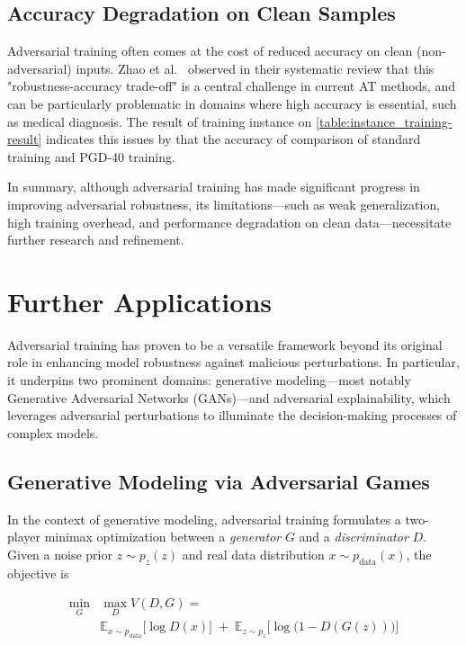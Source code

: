 \documentclass[10pt,twocolumn,letterpaper]{article}
\begin{document}
\subsection{Accuracy Degradation on Clean Samples}
Adversarial training often comes at the cost of reduced accuracy on clean (non-adversarial) inputs. Zhao et al.~\cite{a15080283} observed in their systematic review that this "robustness-accuracy trade-off" is a central challenge in current AT methods, and can be particularly problematic in domains where high accuracy is essential, such as medical diagnosis. The result of training instance on \cref{table:instance_training-result} indicates this issues by that the accuracy of comparison of standard training and PGD-40 training. 

In summary, although adversarial training has made significant progress in improving adversarial robustness, its limitations—such as weak generalization, high training overhead, and performance degradation on clean data—necessitate further research and refinement.

\section{Further Applications}

Adversarial training has proven to be a versatile framework beyond its original role in enhancing model robustness against malicious perturbations. In particular, it underpins two prominent domains: generative modeling—most notably Generative Adversarial Networks (GANs)—and adversarial explainability, which leverages adversarial perturbations to illuminate the decision-making processes of complex models.

\subsection{Generative Modeling via Adversarial Games}

In the context of generative modeling, adversarial training formulates a two-player minimax optimization between a \emph{generator} $G$ and a \emph{discriminator} $D$. Given a noise prior $z\sim p_z(z)$ and real data distribution $x\sim p_{\mathrm{data}}(x)$, the objective is

$$
\begin{aligned}
\min_{G} &\max_{D} V(D,G)= \\
& \mathbb{E}_{x\sim p_{\mathrm{data}}}\bigl[\log D(x)\bigr]
\;+\;\mathbb{E}_{z\sim p_z}\bigl[\log\bigl(1 - D(G(z))\bigr)\bigr]
\end{aligned}
$$
\end{document}
